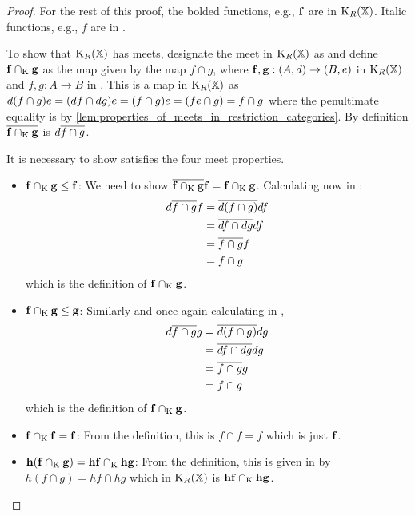 \begin{proof}
  For the rest of this proof, the bolded functions, e.g., $\mathbf{f}$ are in $\text{K}_{R}(\mathbb{X})$.
  Italic functions, e.g., $f$ are in \X.

  To show that $\text{K}_{R}(\mathbb{X})$ has meets,  designate the meet in $\text{K}_{R}(\mathbb{X})$ as \capspl
  and define $\mathbf{f} \cap_{\text{K}} \mathbf{g}$ as the map given by the \X map $f \cap g$, where
  $\mathbf{f},\mathbf{g}:(A,d)\to(B,e)$ in $\text{K}_{R}(\mathbb{X})$ and $f,g:A\to B$ in \X . This is
  a map in $\text{K}_{R}(\mathbb{X})$ as
  $d(f \cap g)e = (d\hspace{0.1pt} f \cap d\hspace{0.1pt} g) e = (f \cap g) e = (f e \cap g) = f\cap g$
  where the penultimate equality is by
  \vref{lem:properties_of_meets_in_restriction_categories}.
  By definition $\overline{\mathbf{f} \cap_{\text{K}} \mathbf{g} }$ is $d\overline{f\cap g}$.

  It is necessary to show \capspl satisfies the four meet properties.
  \begin{itemize}
    \item{$\mathbf{f}\cap_{\text{K}} \mathbf{g} \le \mathbf{f}$: } We need to show
      $\overline{\mathbf{f} \cap_{\text{K}} \mathbf{g}} \mathbf{f} =  \mathbf{f} \cap_{\text{K}} \mathbf{g}$.  Calculating now in \X:
      \begin{align*}
        d \overline{f \cap g} f&= \overline{d(f\cap g)} d f\\
        & = \overline{df \cap dg} df \\
        & = \overline{f \cap g} f \\
        & = f \cap g
      \end{align*}
      which is the definition of $\mathbf{f} \cap_{\text{K}} \mathbf{g}$.
    \item{$\mathbf{f}\cap_{\text{K}} \mathbf{g} \le \mathbf{g}$: } Similarly and once again calculating in \X,
      \begin{align*}
        d \overline{f \cap g} g&= \overline{d(f\cap g)} d g\\
        & = \overline{df \cap dg} dg \\
        & = \overline{f \cap g} g \\
        & = f \cap g
      \end{align*}
      which is the definition of $\mathbf{f} \cap_{\text{K}} \mathbf{g}$.
    \item{$\mathbf{f}\cap_{\text{K}} \mathbf{f} = \mathbf{f}$: } From the definition, this is $f \cap f = f$ which
      is just $ \mathbf{f}$.
    \item{$\mathbf{h}(\mathbf{f}\cap_{\text{K}} \mathbf{g}) = \mathbf{h}\mathbf{f} \cap_{\text{K}} \mathbf{h}\mathbf{g}$: }
      From the definition, this is given in \X by $ h (f \cap g) =
      h f \cap h g$ which in $\text{K}_{R}(\mathbb{X})$ is $\mathbf{h}\mathbf{f} \cap_{\text{K}} \mathbf{h}\mathbf{g}$.
  \end{itemize}
\end{proof}



